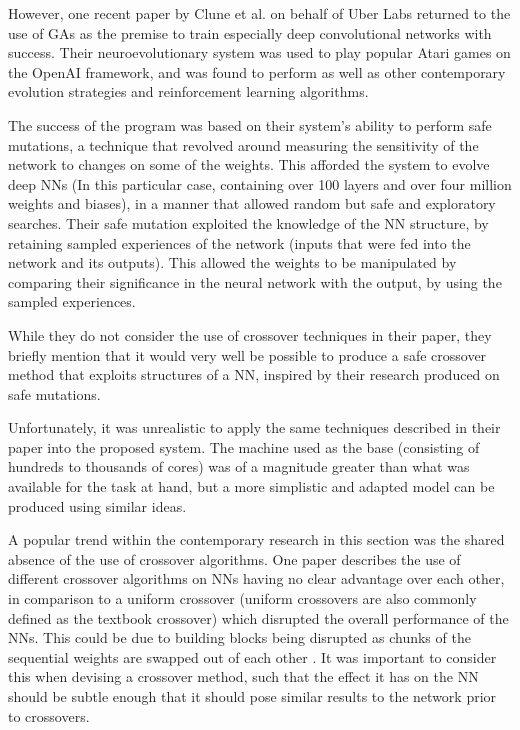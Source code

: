 \documentclass[12pt,a4paper]{article}
\begin{document}
        However, one recent paper by Clune et al. on behalf of Uber Labs returned to the use of GAs as the premise to train especially deep convolutional networks with success. \cite{such_deep_2017} Their neuroevolutionary system was used to play popular Atari games on the OpenAI framework, and was found to perform as well as other contemporary evolution strategies and reinforcement learning algorithms. 

        The success of the program was based on their system's ability to perform safe mutations, a technique that revolved around measuring the sensitivity of the network to changes on some of the weights. \cite{lehman_safe_2017} This afforded the system to evolve deep NNs (In this particular case, containing over 100 layers and over four million weights and biases), in a manner that allowed random but safe and exploratory searches. Their safe mutation exploited the knowledge of the NN structure, by retaining sampled experiences of the network (inputs that were fed into the network and its outputs). This allowed the weights to be manipulated by comparing their significance in the neural network with the output, by using the sampled experiences. 

        While they do not consider the use of crossover techniques in their paper,  they briefly mention that it would very well be possible to produce a safe crossover method that exploits structures of a NN, inspired by their research produced on safe mutations.

        Unfortunately, it was unrealistic to apply the same techniques described in their paper into the proposed system. The machine used as the base (consisting of hundreds to thousands of cores) was of a magnitude greater than what was available for the task at hand, but a more simplistic and adapted model can be produced using similar ideas. 
        
        A popular trend within the contemporary research in this section was the shared absence of the use of crossover algorithms. One paper describes the use of different crossover algorithms on NNs having no clear advantage over each other, in comparison to a uniform crossover (uniform crossovers are also commonly defined as the textbook crossover) which disrupted the overall performance of the NNs. This could be due to building blocks being disrupted as chunks of the sequential weights are swapped out of each other \cite{emmanouilidis_comparison_2000}. It was important to consider this when devising a crossover method, such that the effect it has on the NN should be subtle enough that it should pose similar results to the network prior to crossovers.
\end{document}
